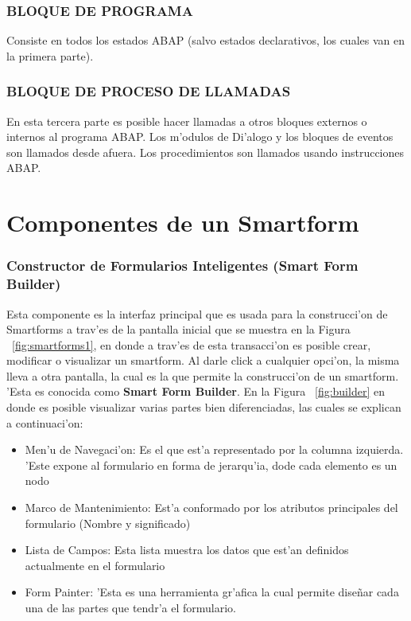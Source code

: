 \subsubsection*{BLOQUE DE PROGRAMA}
	Consiste en todos los estados ABAP (salvo estados declarativos, los cuales van en la primera parte).
	
\subsubsection*{BLOQUE DE PROCESO DE LLAMADAS}
	En esta tercera parte es posible hacer llamadas a otros bloques externos o internos al programa ABAP. Los m'odulos de Di'alogo y los bloques de eventos son llamados desde afuera. Los procedimientos son llamados usando instrucciones ABAP. 
	
\section{Componentes de un Smartform}
\subsubsection{Constructor de Formularios Inteligentes (Smart Form Builder)}
	Esta componente es la interfaz principal que es usada para la construcci'on de Smartforms a trav'es de la pantalla inicial que se muestra en la Figura ~\ref{fig:smartforms1}, en donde a trav'es de esta transacci'on es posible crear, modificar o visualizar un smartform. Al darle click a cualquier opci'on, la misma lleva a otra pantalla, la cual es la que permite la construcci'on de un smartform. 'Esta es conocida como \textbf{Smart Form Builder}. En la Figura ~\ref{fig:builder} en donde es posible visualizar varias partes bien diferenciadas, las cuales se explican a continuaci'on:
\begin{itemize}
\item Men'u de Navegaci'on: Es el que est'a representado por la columna izquierda. 'Este expone al formulario en forma de jerarqu'ia, dode cada elemento es un nodo
\item Marco de Mantenimiento: Est'a conformado por los atributos principales del formulario (Nombre y significado)
\item Lista de Campos: Esta lista muestra los datos que est'an definidos actualmente en el formulario
\item Form Painter: 'Esta es una herramienta gr'afica la cual permite dise\~nar cada una de las partes que tendr'a el formulario.
\end{itemize}
